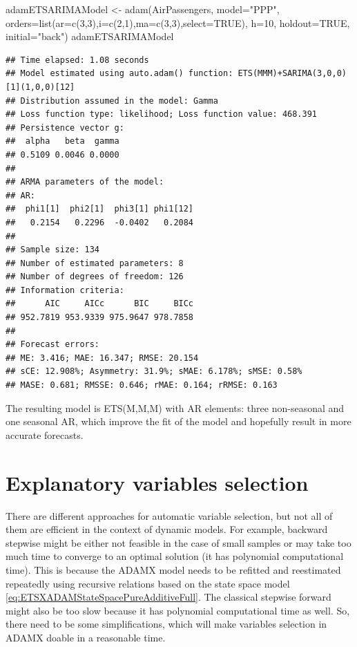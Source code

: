 \documentclass[
]{book}
\newenvironment{Shaded}{\begin{snugshade}}{\end{snugshade}}
\newcommand{\AttributeTok}[1]{\textcolor[rgb]{0.77,0.63,0.00}{#1}}
\newcommand{\ConstantTok}[1]{\textcolor[rgb]{0.00,0.00,0.00}{#1}}
\newcommand{\DecValTok}[1]{\textcolor[rgb]{0.00,0.00,0.81}{#1}}
\newcommand{\FunctionTok}[1]{\textcolor[rgb]{0.00,0.00,0.00}{#1}}
\newcommand{\NormalTok}[1]{#1}
\newcommand{\OtherTok}[1]{\textcolor[rgb]{0.56,0.35,0.01}{#1}}
\newcommand{\StringTok}[1]{\textcolor[rgb]{0.31,0.60,0.02}{#1}}
\theoremstyle{definition}
\theoremstyle{definition}
\theoremstyle{definition}
\theoremstyle{definition}
\theoremstyle{remark}
\begin{document}
\begin{Shaded}
\begin{Highlighting}[]
\NormalTok{adamETSARIMAModel }\OtherTok{\textless{}{-}}
    \FunctionTok{adam}\NormalTok{(AirPassengers, }\AttributeTok{model=}\StringTok{"PPP"}\NormalTok{,}
         \AttributeTok{orders=}\FunctionTok{list}\NormalTok{(}\AttributeTok{ar=}\FunctionTok{c}\NormalTok{(}\DecValTok{3}\NormalTok{,}\DecValTok{3}\NormalTok{),}\AttributeTok{i=}\FunctionTok{c}\NormalTok{(}\DecValTok{2}\NormalTok{,}\DecValTok{1}\NormalTok{),}\AttributeTok{ma=}\FunctionTok{c}\NormalTok{(}\DecValTok{3}\NormalTok{,}\DecValTok{3}\NormalTok{),}\AttributeTok{select=}\ConstantTok{TRUE}\NormalTok{),}
         \AttributeTok{h=}\DecValTok{10}\NormalTok{, }\AttributeTok{holdout=}\ConstantTok{TRUE}\NormalTok{, }\AttributeTok{initial=}\StringTok{"back"}\NormalTok{)}
\NormalTok{adamETSARIMAModel}
\end{Highlighting}
\end{Shaded}

\begin{verbatim}
## Time elapsed: 1.08 seconds
## Model estimated using auto.adam() function: ETS(MMM)+SARIMA(3,0,0)[1](1,0,0)[12]
## Distribution assumed in the model: Gamma
## Loss function type: likelihood; Loss function value: 468.391
## Persistence vector g:
##  alpha   beta  gamma 
## 0.5109 0.0046 0.0000 
## 
## ARMA parameters of the model:
## AR:
##  phi1[1]  phi2[1]  phi3[1] phi1[12] 
##   0.2154   0.2296  -0.0402   0.2084 
## 
## Sample size: 134
## Number of estimated parameters: 8
## Number of degrees of freedom: 126
## Information criteria:
##      AIC     AICc      BIC     BICc 
## 952.7819 953.9339 975.9647 978.7858 
## 
## Forecast errors:
## ME: 3.416; MAE: 16.347; RMSE: 20.154
## sCE: 12.908%; Asymmetry: 31.9%; sMAE: 6.178%; sMSE: 0.58%
## MASE: 0.681; RMSSE: 0.646; rMAE: 0.164; rRMSE: 0.163
\end{verbatim}

The resulting model is ETS(M,M,M) with AR elements: three non-seasonal and one seasonal AR, which improve the fit of the model and hopefully result in more accurate forecasts.

\hypertarget{ETSXSelection}{%
\section{Explanatory variables selection}\label{ETSXSelection}}

There are different approaches for automatic variable selection, but not all of them are efficient in the context of dynamic models. For example, backward stepwise might be either not feasible in the case of small samples or may take too much time to converge to an optimal solution (it has polynomial computational time). This is because the ADAMX model needs to be refitted and reestimated repeatedly using recursive relations based on the state space model \eqref{eq:ETSXADAMStateSpacePureAdditiveFull}. The classical stepwise forward might also be too slow because it has polynomial computational time as well. So, there need to be some simplifications, which will make variables selection in ADAMX doable in a reasonable time.
\end{document}

